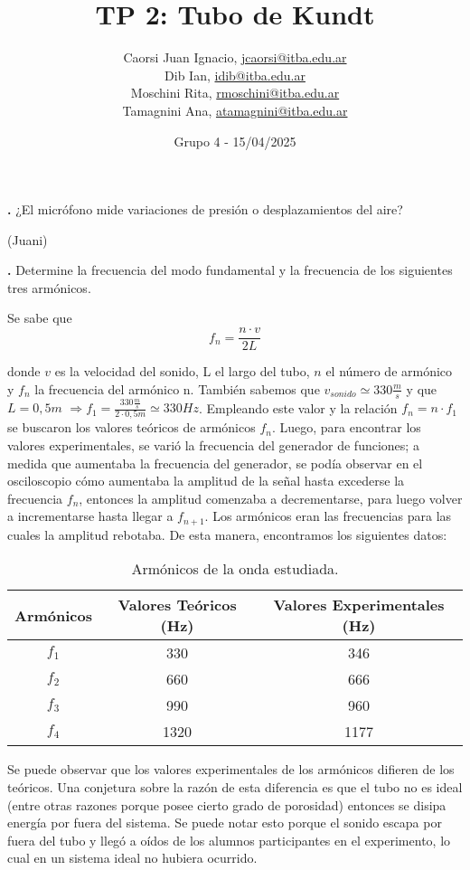 \documentclass[12pt, a4paper]{article}
\title{TP 2: Tubo de Kundt}
\author
{
  Caorsi Juan Ignacio, \href{jcaorsi@itba.edu.ar}{jcaorsi@itba.edu.ar} \\
  Dib Ian, \href{idib@itba.edu.ar}{idib@itba.edu.ar} \\
  Moschini Rita, \href{rmoschini@itba.edu.ar}{rmoschini@itba.edu.ar} \\
  Tamagnini Ana, \href{atamagnini@itba.edu.ar}{atamagnini@itba.edu.ar}
}
\date{Grupo 4 - 15/04/2025}
\newcounter{order}
\newcommand{\order}[1]
{
  \par\vspace{2ex}
  \stepcounter{order}
  \noindent\textbf{\arabic{order}.} #1\par\vspace{1ex}
}
\begin{document}
\maketitle

\order{¿El micrófono mide variaciones de presión o desplazamientos del aire?}

(Juani)


\order{Determine la frecuencia del modo fundamental y la frecuencia de los siguientes tres armónicos.}

Se sabe que
\begin{equation}
    f_{n}=\frac{n\cdot v}{2L}
\end{equation}

donde $v$ es la velocidad del sonido, L el largo del tubo, $n$ el número de armónico y $f_{n}$ la frecuencia del armónico n. También sabemos que $v_{sonido}\simeq 330 \frac{m}{s}$ y que $L=0,5 m$
$\Rightarrow f_{1}=\frac{330 \frac{m}{s} }{2 \cdot 0,5m} \simeq 330 Hz $. Empleando este valor y la relación $f_{n}=n\cdot f_{1}$ se buscaron los valores teóricos de armónicos $f_{n}$. Luego, para encontrar los valores experimentales, se varió la frecuencia del generador de funciones; a medida que aumentaba la frecuencia del generador, se podía observar en el osciloscopio cómo aumentaba la amplitud de la señal hasta excederse la frecuencia $f_{n}$, entonces la amplitud comenzaba a decrementarse, para luego volver a incrementarse hasta llegar a $f_{n+1}$. Los armónicos eran las frecuencias para las cuales la amplitud rebotaba.
De esta manera, encontramos los siguientes datos:

\begin{table}[H]
    \centering
    \begin{tabular}{|c|c|c|}
    \hline
    \multirow{2}{2.1cm}{ Armónicos }
        & Valores Teóricos (Hz) & Valores Experimentales (Hz)\\
    \hline
    $f_1$  & 330  & 346 \\ \hline
    $f_2$  & 660 & 666 \\ \hline
    $f_3$  & 990 & 960 \\ \hline
    $f_4$  & 1320  & 1177 \\ \hline
    \end{tabular}
    \caption{Armónicos de la onda estudiada.}
    \label{tabla1}
\end{table}
Se puede observar que los valores experimentales de los armónicos difieren de los teóricos. Una conjetura sobre la razón de esta diferencia es que el tubo no es ideal (entre otras razones porque posee cierto grado de porosidad) entonces se disipa energía por fuera del sistema. Se puede notar esto porque el sonido escapa por fuera del tubo y llegó a oídos de los alumnos participantes en el experimento, lo cual en un sistema ideal no hubiera ocurrido.
\end{document}
